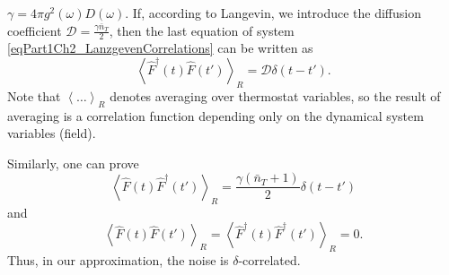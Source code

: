 $\gamma = 4 \pi g^2\left(\omega\right)D\left(\omega\right)$.
If, according to Langevin, we introduce the diffusion coefficient $\mathcal{D} =
\frac{\gamma \bar{n}_{T}}{2}$, then the last equation of system
\eqref{eqPart1Ch2_LanzgevenCorrelations} can be written as
\begin{equation}
\left<\hat{F}^{\dag}\left(t\right)\hat{F}\left(t'\right)\right>_R = 
\mathcal{D} \delta\left(t - t'\right). 
\nonumber
\end{equation}
Note that $\left<\dots\right>_R$ denotes averaging over thermostat variables, so the result of averaging is a correlation function depending only on the dynamical system variables (field).

Similarly, one can prove
\begin{equation}
\left<\hat{F}\left(t\right)\hat{F}^{\dag}\left(t'\right)\right>_R = 
\frac{\gamma\left(\bar{n}_{T} + 1\right)}{2} \delta\left(t - t'\right)
\label{eqPart1Ch2_Lanzgeven_Task1}
\end{equation}
and
\begin{equation}
\left<\hat{F}\left(t\right)\hat{F}\left(t'\right)\right>_R = 
\left<\hat{F}^{\dag}\left(t\right)\hat{F}^{\dag}\left(t'\right)\right>_R = 0.
\label{eqPart1Ch2_Lanzgeven_Task2}
\end{equation}
Thus, in our approximation, the noise is $\delta$-correlated.

